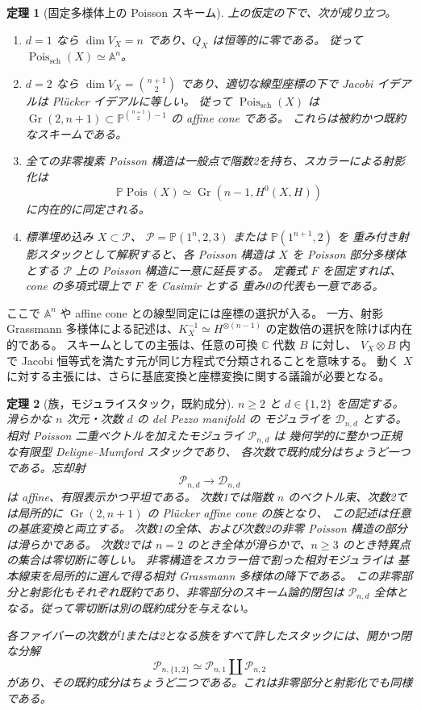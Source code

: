 \documentclass[a4paper,11pt]{ltjsarticle}
\numberwithin{equation}{section}
\theoremstyle{plain}
\newtheorem{theorem}{定理}[section]
\theoremstyle{definition}
\newcommand{\C}{\mathbb C}
\newcommand{\Gr}{\operatorname{Gr}}
\newcommand{\Pois}{\operatorname{Pois}}
\begin{document}
\begin{theorem}[固定多様体上の Poisson スキーム]
\label{thm:main}
上の仮定の下で、次が成り立つ。
\begin{enumerate}
\item $d=1$ なら $\dim V_X=n$ であり、$Q_X$ は恒等的に零である。
従って $\Pois_{\mathrm{sch}}(X)\simeq\mathbb A^n$。
\item $d=2$ なら $\dim V_X=\binom{n+1}{2}$ であり、適切な線型座標の下で
Jacobi イデアルは Pl\"ucker イデアルに等しい。
従って $\Pois_{\mathrm{sch}}(X)$ は
$\Gr(2,n+1)\subset\mathbb P^{\binom{n+1}{2}-1}$ の affine cone である。
これらは被約かつ既約なスキームである。
\item 全ての非零複素 Poisson 構造は一般点で階数2を持ち、スカラーによる射影化は
\[
 \mathbb P\Pois(X)\simeq\Gr(n-1,H^0(X,H))
\]
に内在的に同定される。
\item 標準埋め込み $X\subset\mathcal P$、
$\mathcal P=\mathbb P(1^n,2,3)$ または $\mathbb P(1^{n+1},2)$ を
重み付き射影スタックとして解釈すると、各 Poisson 構造は
$X$ を Poisson 部分多様体とする $\mathcal P$ 上の Poisson 構造に一意に延長する。
定義式 $F$ を固定すれば、cone の多項式環上で $F$ を Casimir とする
重み0の代表も一意である。
\end{enumerate}
\end{theorem}

ここで $\mathbb A^n$ や affine cone との線型同定には座標の選択が入る。
一方、射影 Grassmann 多様体による記述は、$K_X^{-1}\simeq H^{\otimes(n-1)}$
の定数倍の選択を除けば内在的である。
スキームとしての主張は、任意の可換 $\C$ 代数 $B$ に対し、
$V_X\otimes B$ 内で Jacobi 恒等式を満たす元が同じ方程式で分類されることを意味する。
動く $X$ に対する主張には、さらに基底変換と座標変換に関する議論が必要となる。

\begin{theorem}[族，モジュライスタック，既約成分]
\label{thm:relative-main}
$n\geq2$ と $d\in\{1,2\}$ を固定する。
滑らかな $n$ 次元・次数 $d$ の del Pezzo manifold の
モジュライを $\mathcal D_{n,d}$ とする。
相対 Poisson 二重ベクトルを加えたモジュライ $\mathcal P_{n,d}$ は
幾何学的に整かつ正規な有限型 Deligne--Mumford スタックであり、
各次数で既約成分はちょうど一つである。忘却射
\[
 \mathcal P_{n,d}\longrightarrow\mathcal D_{n,d}
\]
は affine、有限表示かつ平坦である。
次数1では階数 $n$ のベクトル束、次数2では局所的に
$\operatorname{Gr}(2,n+1)$ の Pl\"ucker affine cone の族となり、
この記述は任意の基底変換と両立する。
次数1の全体、および次数2の非零 Poisson 構造の部分は滑らかである。
次数2では $n=2$ のとき全体が滑らかで、$n\geq3$ のとき特異点の集合は零切断に等しい。
非零構造をスカラー倍で割った相対モジュライは
基本線束を局所的に選んで得る相対 Grassmann 多様体の降下である。
この非零部分と射影化もそれぞれ既約であり、非零部分のスキーム論的閉包は
$\mathcal P_{n,d}$ 全体となる。従って零切断は別の既約成分を与えない。

各ファイバーの次数が1または2となる族をすべて許したスタックには、開かつ閉な分解
\[
 \mathcal P_{n,\{1,2\}}\simeq\mathcal P_{n,1}\amalg\mathcal P_{n,2}
\]
があり、その既約成分はちょうど二つである。これは非零部分と射影化でも同様である。
\end{theorem}
\end{document}
